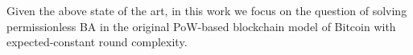 

Given the above state of the art, in this work we focus on the question of solving permissionless BA in the original PoW-based blockchain model of Bitcoin with expected-constant round complexity.



